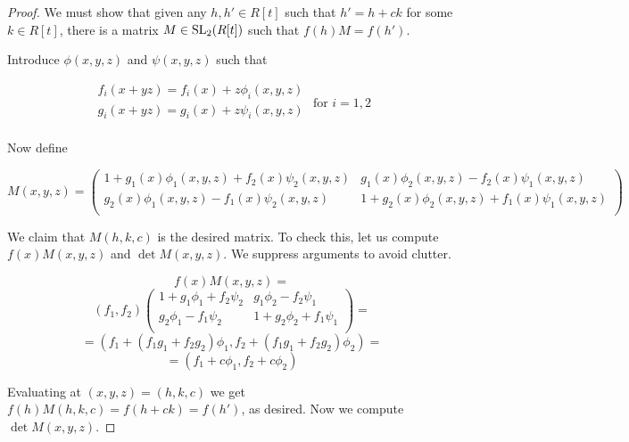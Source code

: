 \begin{proof}
  We must show that given any $h,h' \in R[t]$ such that $h' = h + c k$ for some $k \in R[t]$, there is a matrix
  $M \in \text{SL}_2(R[t])$ such that $f(h) M = f(h')$.

  Introduce $\phi(x,y,z)$ and $\psi(x,y,z)$ such that

  \[
    \begin{matrix}
      f_i(x + yz) = f_i(x) + z\phi_i(x,y,z)  \\
      g_i(x + yz) = g_i(x) + z\psi_i(x,y,z)  \\
    \end{matrix}
    \text{ for } i = 1,2
  \]

  Now define

  \[
    M(x,y,z)
    =
    \begin{pmatrix}
      1 + g_1(x) \phi_1(x,y,z) + f_2(x) \psi_2(x,y,z) & g_1(x) \phi_2(x,y,z) - f_2(x) \psi_1(x,y,z) \\
      g_2(x) \phi_1(x,y,z) - f_1(x) \psi_2(x,y,z) & 1 + g_2(x) \phi_2(x,y,z) + f_1(x) \psi_1(x,y,z) \\
    \end{pmatrix}
  \]

  We claim that $M(h,k,c)$ is the desired matrix.
  To check this, let us compute $f(x) M(x,y,z)$ and $\det M(x,y,z)$.
  We suppress arguments to avoid clutter.

  \[
    f(x) M (x,y,z)
    =
    \]\[
    (f_1, f_2)
    \begin{pmatrix}
      1 + g_1 \phi_1 + f_2 \psi_2 & g_1 \phi_2 - f_2 \psi_1 \\
      g_2 \phi_1 - f_1 \psi_2 & 1 + g_2 \phi_2 + f_1 \psi_1 \\
    \end{pmatrix}
    =
  \]
  \[
    =
    (
    f_1 + (f_1g_1 + f_2g_2) \phi_1
    ,
    f_2 + (f_1g_1 + f_2g_2) \phi_2
    )
    =
  \]
  \[
    =
    (f_1 + c \phi_1, f_2 + c \phi_2)
  \]

  Evaluating at $(x,y,z) = (h,k,c)$ we get $f(h) M(h,k,c) = f(h+ck) = f(h')$, as desired.
  Now we compute $\det M(x,y,z)$.


\end{proof}
